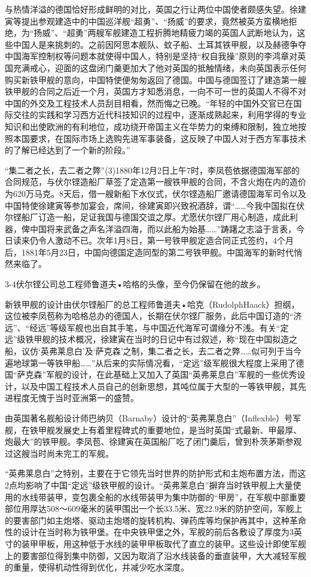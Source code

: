 \documentclass[12pt,UTF8]{ctexbook}
\begin{document}
与热情洋溢的德国恰好形成鲜明的对比，英国之行让两位中国使者颇感失望。徐建寅等提出参观建造中的中国巡洋舰“超勇”、“扬威”的要求，竟然被英方蛮横地拒绝，为“扬威”、“超勇”两艘军舰建造工程折腾地精疲力竭的英国人武断地认为，这些中国人是来挑刺的。之前因阿思本舰队、蚊子船、土耳其铁甲舰，以及赫德争夺中国海军控制权等问题本就使得中国人，特别是坚持“权自我操”原则的李鸿章对英国充满戒心，迎面的这盘闭门羹更加大了他对英国的抵触情绪，未向英国表示任何购买新铁甲舰的意向，中国特使便匆匆返回了德国。中国与德国签订了建造第一艘铁甲舰的合同之后近一个月，英国方才知悉消息，一向不可一世的英国人不得不对中国的外交及工程技术人员刮目相看，然而悔之已晚。“年轻的中国外交官已在国际交往的实践和学习西方近代科技知识的过程中，逐渐成熟起来，利用学得的专业知识和出使欧洲的有利地位，成功绕开帝国主义在华势力的束缚和限制，独立地按照本国要求，在国际市场上选购先进军事装备，这反映了中国人对于西方军事技术的了解已经达到了一个新的阶段。”

“集二者之长，去二者之弊”(3)1880年12月2日上午7时，李凤苞依据德国海军部的合同规范，与伏尔铿造船厂草签了定造第一艘铁甲舰的合同，不含火炮在内的造价为620万马克。8天后，借一艘新船下水仪式，伏尔铿造船厂邀请德国海军司令以及中国特使徐建寅等参加宴会，席间，徐建寅即兴致祝酒辞，谓“……今我中国拟在伏尔铿船厂订造一船，足证我国与德国交谊之厚。尤愿伏尔铿厂用心制造，成此利器，俾中国将来武备之声名洋溢四海，而以此船为始基……”踌躇之志溢于言表，今日读来仍令人激动不已。次年1月8日，第一号铁甲舰定造合同正式签约，4个月后，1881年5月23日，中国向德国定造同型的第二号铁甲舰。中国海军的新时代悄然来临了。

3-4伏尔铿公司总工程师鲁道夫•哈格的头像，至今仍保留在他的故乡。

新铁甲舰的设计由伏尔铿船厂的总工程师鲁道夫•哈克（RudolphHaack）担纲，这位被李凤苞称为哈格总办的德国人，长期在伏尔铿厂服务，此后中国订造的“济远”、“经远”等级军舰也出自其手笔，与中国近代海军可谓缘分不浅。有关“定远”级铁甲舰的技术概况，徐建寅在当时的日记中有过叙述，称“现在中国拟造之船，议仿‘英弗莱息白’及‘萨克森’之制，集二者之长，去二者之弊……似可列于当今遍地球第一等铁甲船……”从后来的实际情况看，“定远”级军舰很大程度上采用了德国“萨克森”军舰的设计，在此基础上又加入了英国“英弗莱息白”军舰的一些优秀设计，以及中国工程技术人员自己的创新思想，其吨位属于大型的一等铁甲舰，其先进程度无愧于当时亚洲第一的盛赞。

由英国著名舰船设计师巴纳贝（Barnaby）设计的“英弗莱息白”（Inflexble）号军舰，在铁甲舰发展史上有着里程碑式的重要地位，是当时英国“式最新、甲最厚、炮最大”的铁甲舰。李凤苞、徐建寅在英国船厂吃了闭门羹后，曾到朴茨茅斯参观过这艘当时尚未完工的军舰。

“英弗莱息白”之特别，主要在于它领先当时世界的防护形式和主炮布置方法，而这2点均影响了中国“定远”级铁甲舰的设计。“英弗莱息白”摒弃当时铁甲舰上大量使用的水线带装甲，变包裹全船的水线带装甲为集中防御的“甲房”，在军舰中部重要部位用厚达508～609毫米的装甲围出一个长33.5米、宽22.9米的防护空间，军舰上的要害部门如主炮塔、驱动主炮塔的旋转机构、弹药库等均保护再其中，这种革命性的设计在当时称为铁甲堡。在中央铁甲堡之外，军舰的前后各敷设了厚度为3英寸的装甲甲板，用这种低于水线的装甲甲板取代了直立的装甲。这些设计即使军舰上的要害部位得到集中防御，又因为取消了沿水线装备的垂直装甲，大大减轻军舰的重量，使得机动性得到优化，并减少吃水深度。
\end{document}
